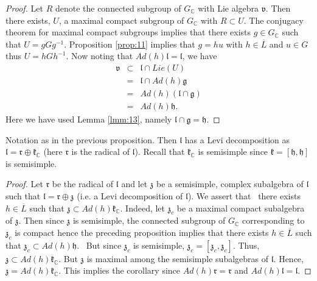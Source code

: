 \documentclass{amse-new}
\numberwithin{equation}{section} %
\begin{document}
\begin{proof}
Let $R$ denote the connected subgroup of $G_{\mathbb{C}}$ with Lie algebra
$\mathfrak{v}$. Then there exists, $U$, a maximal compact subgroup of
$G_{\mathbb{C}}$ with $R\subset U$. The conjugacy theorem for maximal compact
subgroups implies that there exists $g\in G_{\mathbb{C}}$ such that
$U=gGg^{-1}$. Proposition \ref{prop:11} implies that $g=hu$ with
$h\in\overline{L}$ and $u\in G$ thus $U=hGh^{-1}$. Now noting that
$Ad(h)\mathfrak{l}=\mathfrak{l}$, we have
\begin{eqnarray*}
\mathfrak{v}&\subset& \mathfrak{l}\cap Lie(U)\\
&=&\mathfrak{l}\cap Ad(h)\mathfrak{g}\\
&=&Ad(h)(\mathfrak{l}\cap\mathfrak{g})\\
&=&Ad(h)\mathfrak{h}.
\end{eqnarray*}
Here we have used Lemma \ref{lmm:13}, namely $\mathfrak{l}\cap\mathfrak{g}=\mathfrak{h}$.
\end{proof}

\begin{corollary}
\label{coro:11} Notation as in the previous proposition. Then $\mathfrak{l}$ has a
Levi decomposition as  $\mathfrak{l}=\mathfrak{r}\oplus\mathfrak{k}_{\mathbb{C}}$ (here
$\mathfrak{r}$ is the radical of $\mathfrak{l}$). Recall that
$\mathfrak{k}_{\mathbb{C}}$ is semisimple since $\mathfrak{k}=[\mathfrak{h}, \mathfrak{h}]$ is semisimple.
\end{corollary}

\begin{proof}
Let $\mathfrak{r}$ be the radical of $\mathfrak{l}$ and let $\mathfrak{z}$ be
a semisimple, complex subalgebra of $\mathfrak{l}$ such that $\mathfrak{l}%
=\mathfrak{r}\oplus\mathfrak{z}$ (i.e. a Levi decomposition of $\mathfrak{l}
$). We assert that \ there exists $h\in\overline{L}$ such that $\mathfrak{z}%
\subset Ad(h)\mathfrak{k}_{\mathbb{C}}$. Indeed, let $\mathfrak{z}_{c}$ be a
maximal compact subalgebra of $\mathfrak{z}$. Then since $\mathfrak{z}$ is
semisimple, the connected subgroup of $G_{\mathbb{C}}$ corresponding to
$\mathfrak{z}_{c}$ is compact hence the preceding proposition implies that
there exists $h\in\overline{L}$ such that $\mathfrak{z}_{c}\subset
Ad(h)\mathfrak{h}$. \ But since $\mathfrak{z}_{c}$ is semisimple,
$\mathfrak{z}_{c}=[\mathfrak{z}_{c},\mathfrak{z}_{c}]$. Thus, $\mathfrak{z}%
\subset Ad(h)\mathfrak{k}_{\mathbb{C}}$. But $\mathfrak{z}$ is maximal among
the semisimple subalgebras of $\mathfrak{l}$. Hence, $\mathfrak{z}%
=Ad(h)\mathfrak{k}_{\mathbb{C}}$. This implies the corollary since
$Ad(h)\mathfrak{r}=\mathfrak{r}$ and $Ad(h)\mathfrak{l}=\mathfrak{l}$.
\end{proof}
\end{document}
